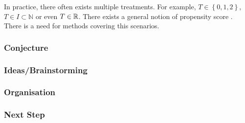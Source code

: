 In practice, there often exists multiple treatments.
For example, $T\in \left\{
  0,1,2
\right\}$, $T\in I\subset \mathbb{N}$ or even $T\in\mathbb{R}$. 
There exists a general notion of propensity score \cite{Hirano2005}.
There is a need for methods covering this scenarios.
\subsubsection{Conjecture}
\subsubsection{Ideas/Brainstorming}
\subsubsection{Organisation}
\subsubsection{Next Step}
